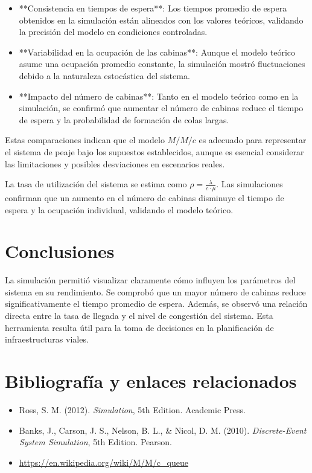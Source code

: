 \documentclass[12pt]{article}
\begin{document}
    \begin{itemize}
        \item **Consistencia en tiempos de espera**: Los tiempos promedio de espera obtenidos en la simulación están alineados con los valores teóricos, validando la precisión del modelo en condiciones controladas.
        \item **Variabilidad en la ocupación de las cabinas**: Aunque el modelo teórico asume una ocupación promedio constante, la simulación mostró fluctuaciones debido a la naturaleza estocástica del sistema.
        \item **Impacto del número de cabinas**: Tanto en el modelo teórico como en la simulación, se confirmó que aumentar el número de cabinas reduce el tiempo de espera y la probabilidad de formación de colas largas.
    \end{itemize}
    
    Estas comparaciones indican que el modelo \( M/M/c \) es adecuado para representar el sistema de peaje bajo los supuestos establecidos, aunque es esencial considerar las limitaciones y posibles desviaciones en escenarios reales.
    
La tasa de utilización del sistema se estima como $\rho = \frac{\lambda}{c \cdot \mu}$. Las simulaciones confirman que un aumento en el número de cabinas disminuye el tiempo de espera y la ocupación individual, validando el modelo teórico.

\section{Conclusiones}
La simulación permitió visualizar claramente cómo influyen los parámetros del sistema en su rendimiento. Se comprobó que un mayor número de cabinas reduce significativamente el tiempo promedio de espera. Además, se observó una relación directa entre la tasa de llegada y el nivel de congestión del sistema. Esta herramienta resulta útil para la toma de decisiones en la planificación de infraestructuras viales.



\section*{Bibliografía y enlaces relacionados}

\begin{itemize}
  \item Ross, S. M. (2012). \textit{Simulation}, 5th Edition. Academic Press.
  \item Banks, J., Carson, J. S., Nelson, B. L., \& Nicol, D. M. (2010). \textit{Discrete-Event System Simulation}, 5th Edition. Pearson.
  \item \url{https://en.wikipedia.org/wiki/M/M/c_queue}
  

\end{itemize}
\end{document}

